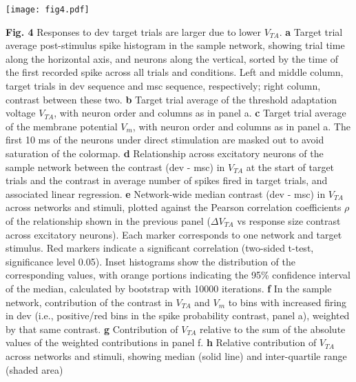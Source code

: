 \documentclass[pdflatex,referee,iicol,sn-basic]{sn-jnl}
\theoremstyle{thmstyleone}%
\theoremstyle{thmstyletwo}%
\theoremstyle{thmstylethree}%
\begin{document}
\begin{figure*}%
    \centering
    \texttt{[image: fig4.pdf]}
    \caption{}
    \label{fig4}
\end{figure*}
\textbf{Fig. 4} Responses to dev target trials are larger due to lower $V_{TA}$.
\textbf{a} Target trial average post-stimulus spike histogram in the sample network, showing trial time along the horizontal axis, and neurons along the vertical, sorted by the time of the first recorded spike across all trials and conditions. Left and middle column, target trials in dev sequence and msc sequence, respectively; right column, contrast between these two.
\textbf{b} Target trial average of the threshold adaptation voltage $V_{TA}$, with neuron order and columns as in panel a.
\textbf{c} Target trial average of the membrane potential $V_m$, with neuron order and columns as in panel a. The first 10 ms of the neurons under direct stimulation are masked out to avoid saturation of the colormap.
\textbf{d} Relationship across excitatory neurons of the sample network between the contrast (dev - msc) in $V_{TA}$ at the start of target trials and the contrast in average number of spikes fired in target trials, and associated linear regression.
\textbf{e} Network-wide median contrast (dev - msc) in $V_{TA}$ across networks and stimuli, plotted against the Pearson correlation coefficients $\rho$ of the relationship shown in the previous panel ($\Delta V_{TA}$ vs response size contrast across excitatory neurons). Each marker corresponds to one network and target stimulus. Red markers indicate a significant correlation (two-sided t-test, significance level 0.05). Inset histograms show the distribution of the corresponding values, with orange portions indicating the 95\% confidence interval of the median, calculated by bootstrap with 10000 iterations.
\textbf{f} In the sample network, contribution of the contrast in $V_{TA}$ and $V_m$ to bins with increased firing in dev (i.e., positive/red bins in the spike probability contrast, panel a), weighted by that same contrast.
\textbf{g} Contribution of $V_{TA}$ relative to the sum of the absolute values of the weighted contributions in panel f.
\textbf{h} Relative contribution of $V_{TA}$ across networks and stimuli, showing median (solid line) and inter-quartile range (shaded area)
\end{document}
